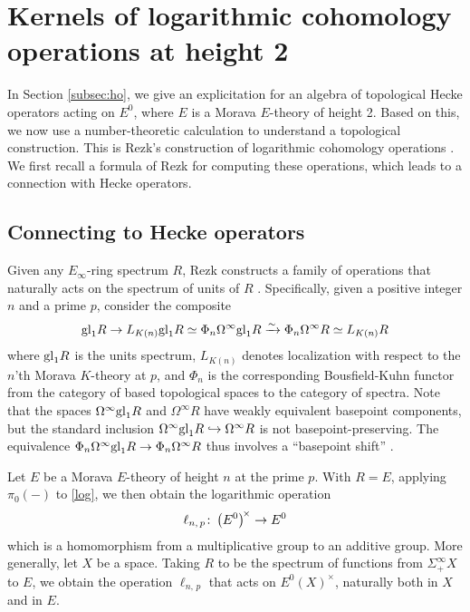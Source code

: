 \documentclass{gtpart}
\theoremstyle{definition}
\theoremstyle{remark}
\def\co{\colon\thinspace}
\renewcommand{\=}{\approx}
\renewcommand{\-}{\sim}
\newcommand{\gl}{{\rm gl}}
\numberwithin{equation}{section}
\numberwithin{thm}{section}
\begin{document}
\section{Kernels of logarithmic cohomology operations at height 2}
\label{sec:kerlog}

In Section \ref{subsec:ho}, we give an explicitation for an algebra of 
topological Hecke operators acting on $E^0$, where $E$ is a Morava $E$-theory of 
height 2.  Based on this, we now use a number-theoretic calculation to 
understand a topological construction.  This is Rezk's construction of 
logarithmic cohomology operations \cite{log}.  We first recall a formula of Rezk 
for computing these operations, which leads to a connection with Hecke 
operators.  



\subsection{Connecting to Hecke operators}

Given any $E_\infty$-ring spectrum $R$, Rezk constructs a family of operations 
that naturally acts on the spectrum of units of $R$ \cite[Definition 3.6]{log}.  
Specifically, given a positive integer $n$ and a prime $p$, consider the 
composite 
\begin{equation}
 \label{log}
 \gl_1 R \to L_{K(n)} \gl_1 R \simeq \Phi_n \Omega^\infty \gl_1 R 
 \xrightarrow{\sim} \Phi_n \Omega^\infty R \simeq L_{K(n)} R 
\end{equation}
where $\gl_1 R$ is the units spectrum, $L_{K(n)}$ denotes localization with 
respect to the $n$'th Morava $K$-theory at $p$, and $\Phi_n$ is the 
corresponding Bousfield-Kuhn functor from the category of based topological 
spaces to the category of spectra.  Note that the spaces $\Omega^\infty \gl_1 R$ 
and $\Omega^\infty R$ have weakly equivalent basepoint components, but the 
standard inclusion $\Omega^\infty \gl_1 R \hookrightarrow \Omega^\infty R$ is 
not basepoint-preserving.  The equivalence 
$\Phi_n \Omega^\infty \gl_1 R \to \Phi_n \Omega^\infty R$ thus involves a 
``basepoint shift'' \cite[3.4]{log}.  

Let $E$ be a Morava $E$-theory of height $n$ at the prime $p$.  With $R = E$, 
applying $\pi_0(-)$ to \eqref{log}, we then obtain the logarithmic operation 
\[
 \ell_{n,\,p} \co \big( E^0 \big)^{\!\times} \to E^0 
\]
which is a homomorphism from a multiplicative group to an additive group.  More 
generally, let $X$ be a space.  Taking $R$ to be the spectrum of functions from 
$\Sigma^\infty_+ X$ to $E$, we obtain the operation $\ell_{n,\,p}$ that acts on 
$E^0(X)^\times$, naturally both in $X$ and in $E$.  
\end{document}
